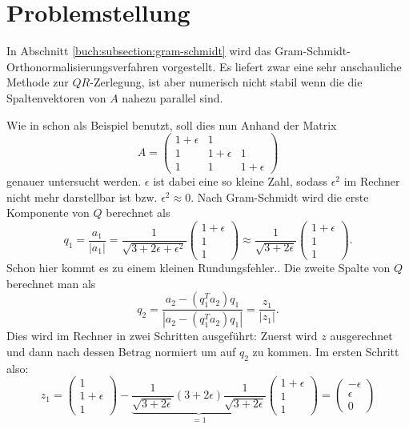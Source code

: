 %
%
%
\section{Problemstellung
\label{qr:section:problemstellung}}
In Abschnitt \ref{buch:subsection:gram-schmidt} wird das Gram-Schmidt-Orthonormalisierungsverfahren vorgestellt.
Es liefert zwar eine sehr anschauliche Methode zur $QR$-Zerlegung, ist aber numerisch nicht stabil wenn die die Spaltenvektoren von $A$ nahezu parallel sind.

Wie in \cite{qr:tam} schon als Beispiel benutzt, soll dies nun Anhand der Matrix
\begin{equation*}
A=\begin{pmatrix}
1+\epsilon&1&\\
1&1+\epsilon&1\\
1&1&1+\epsilon
\end{pmatrix}
\end{equation*}
genauer untersucht werden.
$\epsilon$ ist dabei eine so \glqq kleine\grqq{} Zahl, sodass $\epsilon^2$ im Rechner nicht mehr darstellbar ist bzw. $\epsilon^2\approx0$.
Nach Gram-Schmidt wird die erste Komponente von $Q$ berechnet als
\begin{equation*}
q_1=\frac{a_1}{|a_1|}=\frac{1}{\sqrt{3+2\epsilon+\epsilon^2}}
\begin{pmatrix}
1+\epsilon\\
1\\
1
\end{pmatrix}\approx\frac{1}{\sqrt{3+2\epsilon}}
\begin{pmatrix}
1+\epsilon\\
1\\
1
\end{pmatrix}.
\end{equation*}
Schon hier kommt es zu einem kleinen Rundungsfehler..
Die zweite Spalte von $Q$ berechnet man als
\begin{equation*}
q_2=\frac{a_2-(q_1^Ta_2)q_1}{|a_2-(q_1^Ta_2)q_1|}=\frac{z_1}{|z_1|}.
\end{equation*} 
Dies wird im Rechner in zwei Schritten ausgeführt: Zuerst wird $z$ ausgerechnet und dann nach dessen Betrag normiert um auf $q_2$ zu kommen.
Im ersten Schritt also:
\begin{equation*}
z_1=
\begin{pmatrix}
1\\
1+\epsilon\\
1
\end{pmatrix}-\underbrace{\frac{1}{\sqrt{3+2\epsilon}}(3+2\epsilon)\frac{1}{\sqrt{3+2\epsilon}}}_{=1}
\begin{pmatrix}
1+\epsilon\\
1\\
1
\end{pmatrix}=
\begin{pmatrix}
-\epsilon\\
\epsilon\\
0
\end{pmatrix}
\end{equation*}

